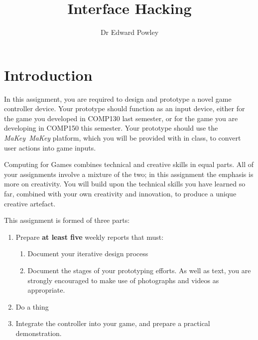 \documentclass{../fal_assignment}
\title{Interface Hacking}
\author{Dr Edward Powley}
\begin{document}
\maketitle
%    
\section*{Introduction}

In this assignment, you are required to design and prototype a novel game controller device.
Your prototype should function as an input device, either for the game you developed in COMP130 last semester,
or for the game you are developing in COMP150 this semester.
Your prototype should use the \emph{MaKey~MaKey} platform, which you will be provided with in class,
to convert user actions into game inputs.

Computing for Games combines technical and creative skills in equal parts.
All of your assignments involve a mixture of the two;
in this assignment the emphasis is more on creativity.
You will build upon the technical skills you have learned so far,
combined with your own creativity and innovation,
to produce a unique creative artefact.

This assignment is formed of three parts:

\begin{enumerate}[label=\Alph*.]
    \item Prepare \textbf{at least five} weekly reports that must:
        \begin{enumerate}[label=\roman*.]
            \item Document your iterative design process
            \item Document the stages of your prototyping efforts.
                As well as text, you are strongly encouraged to make use of photographs and videos as appropriate.
        \end{enumerate}
    \item Do a thing
    \item Integrate the controller into your game, and prepare a practical demonstration.
\end{enumerate}
\end{document}
